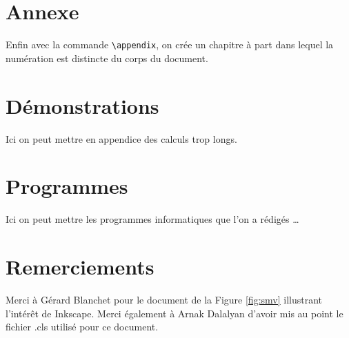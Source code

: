\chapter*{Annexe}
Enfin avec la commande \lstinline+\appendix+, on crée un chapitre à part dans lequel la numération est distincte du corps du document.
\chapter{Démonstrations }
Ici on peut mettre en appendice des calculs trop longs. 
\chapter{Programmes}
Ici on peut mettre les programmes informatiques que l'on a rédigés \ldots

\chapter{Remerciements}
Merci \`a G\'erard Blanchet pour le document  de la Figure \ref{fig:smv}
illustrant l'intérêt de Inkscape. Merci \'egalement \`a Arnak Dalalyan
d'avoir mis au point le fichier .cls utilisé pour ce document.